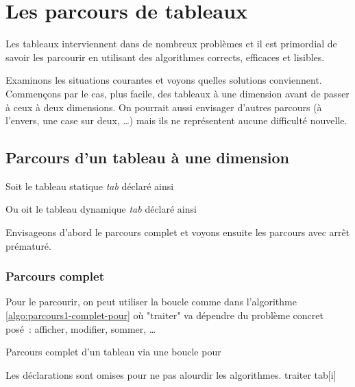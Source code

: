 \chapter{Les parcours de tableaux} \label{Les parcours de tableaux}

Les tableaux interviennent dans de nombreux problèmes 
et il est primordial de savoir les parcourir 
en utilisant des algorithmes
corrects, efficaces et lisibles.

Examinons les situations courantes et voyons quelles solutions conviennent.
Commençons par le cas, plus facile, des tableaux à une dimension
avant de passer à ceux à deux dimensions.
On pourrait aussi envisager d'autres parcours
(à l'envers, une case sur deux, \dots) 
mais ils ne représentent aucune difficulté nouvelle.

\section{Parcours d'un tableau à une dimension}

Soit le tableau statique \textit{tab} déclaré ainsi


Ou oit le tableau dynamique \textit{tab} déclaré ainsi



Envisageons d'abord le parcours complet
et voyons ensuite les parcours avec arrêt prématuré.

\subsection{Parcours complet}

Pour le parcourir, on peut utiliser la boucle 
comme dans l'algorithme \vref{algo:parcours1-complet-pour}
où "traiter" va dépendre du problème concret posé~:
afficher, modifier, sommer, \dots

\begin{algorithm}[H]
\begin{pseudo}
	\caption{Parcours complet d'un tableau via une boucle pour}
	\label{algo:parcours1-complet-pour}
	\LComment Les déclarations sont omises pour ne pas alourdir les algorithmes.
		\Stmt traiter tab[i]
	\EndFor
\end{pseudo}
\end{algorithm}

